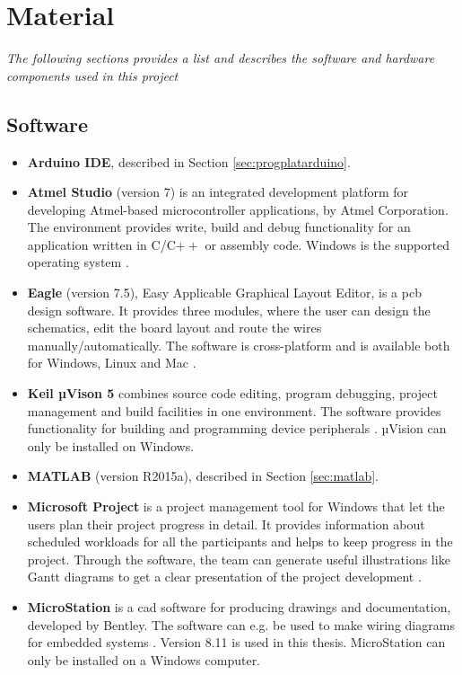 \chapter{Material}
\textit{The following sections provides a list and describes the software and hardware components used in this project}
\section{Software}
\label{sec:software}
\begin{itemize}
    \item \textbf{Arduino IDE}, described in Section \ref{sec:progplatarduino}.
    \item \textbf{Atmel Studio} (version 7) is an integrated development platform for developing Atmel-based microcontroller applications, by Atmel Corporation. The environment provides write, build and debug functionality for an application written in C/C$++$ or assembly code. Windows is the supported operating system \cite{atmel}. 
    \item \textbf{Eagle} (version 7.5), Easy Applicable Graphical Layout Editor, is a \acrfull{pcb} design software. It provides three modules, where the user can design the schematics, edit the board layout and route the wires manually/automatically. The software is cross-platform and is available both for Windows, Linux and Mac \cite{eagle}.
    \item \textbf{Keil µVison 5} combines source code editing, program debugging, project management and build facilities in one environment. The software provides functionality for building and programming device peripherals \cite{uvision}. µVision can only be installed on Windows.
    \item \textbf{MATLAB} (version R2015a), described in Section \ref{sec:matlab}.
    \item \textbf{Microsoft Project} is a project management tool for Windows that let the users plan their project progress in detail. It provides information about scheduled workloads for all the participants and helps to keep progress in the project. Through the software, the team can generate useful illustrations like Gantt diagrams to get a clear presentation of the project development \cite{msproject}. 
    \item \textbf{MicroStation} is a \acrfull{cad} software for producing drawings and documentation, developed by Bentley. The software can e.g. be used to make wiring diagrams for embedded systems \cite{microstation}. Version 8.11 is used in this thesis. MicroStation can only be installed on a Windows computer.

\end{itemize}

